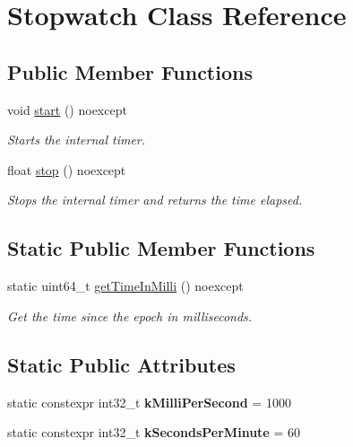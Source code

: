 \hypertarget{classStopwatch}{}\section{Stopwatch Class Reference}
\label{classStopwatch}
\subsection*{Public Member Functions}
\begin{DoxyCompactItemize}
\item 
void \mbox{\hyperlink{classStopwatch_aff8757dda8e913cc671eb3baeb662109}{start}} () noexcept
\begin{DoxyCompactList}\small\item\em Starts the internal timer. \end{DoxyCompactList}\item 
float \mbox{\hyperlink{classStopwatch_ae614c46daae8d773f15d7ff603245cd0}{stop}} () noexcept
\begin{DoxyCompactList}\small\item\em Stops the internal timer and returns the time elapsed. \end{DoxyCompactList}\end{DoxyCompactItemize}
\subsection*{Static Public Member Functions}
\begin{DoxyCompactItemize}
\item 
static uint64\+\_\+t \mbox{\hyperlink{classStopwatch_a789c42b276146b4d043fac2e30684d7c}{get\+Time\+In\+Milli}} () noexcept
\begin{DoxyCompactList}\small\item\em Get the time since the epoch in milliseconds. \end{DoxyCompactList}\end{DoxyCompactItemize}
\subsection*{Static Public Attributes}
\begin{DoxyCompactItemize}
\item 
\mbox{\label{classStopwatch_a9d3511a4c1fb3544757883f0ffc6f140}} 
static constexpr int32\+\_\+t {\bfseries k\+Milli\+Per\+Second} = 1000
\item 
\mbox{\label{classStopwatch_a2603fc92466f39b1ac12718ac3d052e8}} 
static constexpr int32\+\_\+t {\bfseries k\+Seconds\+Per\+Minute} = 60
\end{DoxyCompactItemize}
